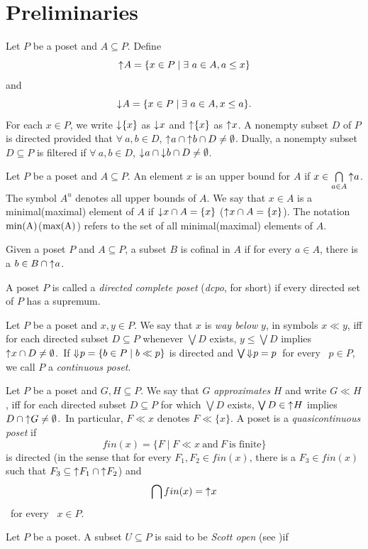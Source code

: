 \documentclass[preprint,12pt]{elsarticle}
\numberwithin{equation}{section}
\newcommand{\dn}{\mathord{\downarrow}\hspace{0.05em}}
\newcommand{\up}{\mathord{\uparrow}\hspace{0.05em}}
\newcommand{\uuar}{\mathord{\Downarrow}\hspace{0.05em}}
\begin{document}
\section{Preliminaries}
\label{}

\quad Let $P$ be a poset and $A\subseteq P$. Define $$\up A=\{x\in P\mid \exists\ a\in A, a\leq x \}$$ and $$\dn A=\{x\in P\mid \exists\ a\in A, x\leq a\}.$$
For each $x\in P$, we write $\dn\{x\}$ as $\dn x$ and $\up\{x\}$ as $\up x$. A nonempty subset $D$ of $P$ is directed provided that $\forall\ a,b\in D$, $\up a\cap \up b \cap D\neq\emptyset$. Dually, a nonempty subset $D\subseteq P$ is filtered if $\forall\ a,b\in D$, $\dn a\cap \dn b \cap D\neq\emptyset$.

\quad Let $P$ be a poset and $A\subseteq P$. An element $x$ is an upper bound for $A$ if $x\in\bigcap\limits_{a\in A}\up a$. The symbol $A^{u}$ denotes all upper bounds of $A$. We say that $x\in A$ is a minimal(maximal) element of $A$ if $\dn x\cap A=\{x\}$ ($\up x\cap A=\{x\}$). The notation ${\rm min(A)}$(${\rm max(A)}$) refers to the set of all minimal(maximal) elements of $A$.

\quad Given a poset $P$ and $A\subseteq P$, a subset $B$ is cofinal in $A$ if for every $a\in A$, there is a $b\in B\cap\up a$.

\quad A poset $P$ is called a {\em directed complete poset} ({\em dcpo}, for short) if every
directed set of $P$ has a supremum.

\quad Let $P$ be a poset and $x, y\in P$. We say that $x$ is {\em way below} $y$, in symbols $x\ll y$, iff for each directed subset $D\subseteq P$ whenever $\bigvee D$ exists, $y\leq\bigvee D$ implies $\up x\cap D\neq\emptyset$.\ If $\uuar p=\{b\in P\mid b\ll p\}$ is directed and $\bigvee \uuar p=p$\ for every \ $p\in P$, we call $P$ a {\em continuous poset}.

\quad Let $P$ be a poset and $G, H\subseteq P$. We say that $G$ {\em approximates} $H$ and write $G\ll H$, iff for each directed subset $D\subseteq P$ for which $\bigvee D$ exists, $\bigvee D\in\up H$ implies $D\cap\up G\neq\emptyset$.\ In particular, $F\ll x$ denotes $F\ll\{x\}$. A poset is a {\em quasicontinuous poset}
 if $$fin(x)=\{F\mid F\ll x\ \mbox{and}\ F\ \mbox{is finite}\}$$ is directed (in the sense that for every $F_{1},F_{2}\in fin(x)$, there is a $F_{3}\in fin(x)$ such that $F_{3}\subseteq \up F_{1}\cap \up F_{2}$) and $$\bigcap fin(x)=\up x$$\ for every \ $x\in P$.

\quad Let $P$ be a poset. A subset $U\subseteq P$ is said to be {\em Scott open} (see \cite{GG03,JG13})if
\end{document}

